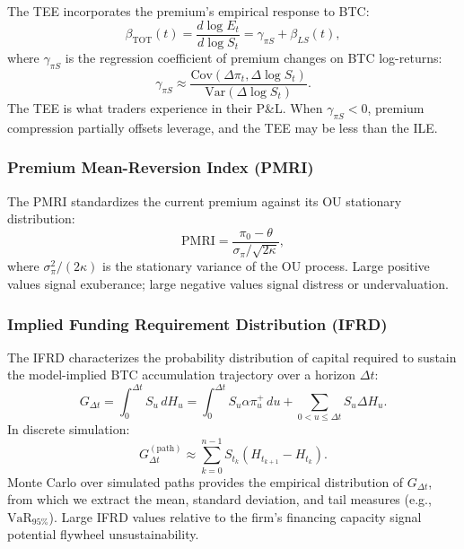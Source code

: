 The TEE incorporates the premium's empirical response to BTC:
\begin{equation}
    \beta_{\text{TOT}}(t) = \frac{d\log E_t}{d\log S_t} = \gamma_{\pi S} + \beta_{LS}(t),
\end{equation}
where $\gamma_{\pi S}$ is the regression coefficient of premium changes on BTC log-returns:
\begin{equation}
    \gamma_{\pi S} \approx \frac{\text{Cov}(\Delta \pi_t, \Delta \log S_t)}{\text{Var}(\Delta \log S_t)}.
\end{equation}
The TEE is what traders experience in their P\&L. When $\gamma_{\pi S} < 0$, premium compression partially offsets leverage, and the TEE may be less than the ILE.

\subsubsection{Premium Mean-Reversion Index (PMRI)}

The PMRI standardizes the current premium against its OU stationary distribution:
\begin{equation}
    \text{PMRI} = \frac{\pi_0 - \theta}{\sigma_\pi / \sqrt{2\kappa}},
\end{equation}
where $\sigma_\pi^2 / (2\kappa)$ is the stationary variance of the OU process. Large positive values signal exuberance; large negative values signal distress or undervaluation.

\subsubsection{Implied Funding Requirement Distribution (IFRD)}

The IFRD characterizes the probability distribution of capital required to sustain the model-implied BTC accumulation trajectory over a horizon $\Delta t$:
\begin{equation}
    G_{\Delta t} = \int_0^{\Delta t} S_u\, dH_u = \int_0^{\Delta t} S_u \alpha \pi_u^+\, du + \sum_{0 < u \le \Delta t} S_u \Delta H_u.
\end{equation}
In discrete simulation:
\begin{equation}
    G_{\Delta t}^{(\text{path})} \approx \sum_{k=0}^{n-1} S_{t_k}(H_{t_{k+1}} - H_{t_k}).
\end{equation}
Monte Carlo over simulated paths provides the empirical distribution of $G_{\Delta t}$, from which we extract the mean, standard deviation, and tail measures (e.g., $\text{VaR}_{95\%}$). Large IFRD values relative to the firm's financing capacity signal potential flywheel unsustainability.

